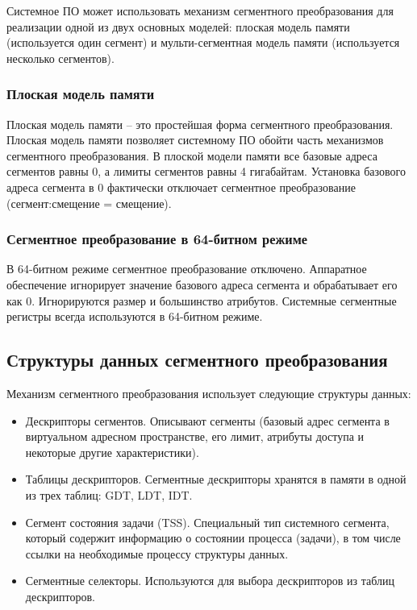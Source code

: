 Системное ПО может использовать механизм сегментного преобразования для реализации одной из двух основных
моделей: плоская модель памяти (используется один сегмент) и мульти-сегментная модель памяти
(используется несколько сегментов).

\subsubsection*{Плоская модель памяти}
Плоская модель памяти -- это простейшая форма сегментного преобразования. Плоская модель памяти позволяет
системному ПО обойти часть механизмов сегментного преобразования. В плоской модели памяти все базовые адреса
сегментов равны 0, а лимиты сегментов равны 4 гигабайтам. Установка базового адреса сегмента в 0 фактически
отключает сегментное преобразование (сегмент:смещение = смещение).

\subsubsection*{Сегментное преобразование в 64-битном режиме}
В 64-битном режиме сегментное преобразование отключено. Аппаратное обеспечение игнорирует значение
базового адреса сегмента и обрабатывает его как 0. Игнорируются размер и большинство атрибутов.
Системные сегментные регистры всегда используются в 64-битном режиме.

\subsection{Структуры данных сегментного преобразования}
Механизм сегментного преобразования использует следующие структуры данных:
\begin{itemize}
\item Дескрипторы сегментов. Описывают сегменты (базовый адрес сегмента в виртуальном
	адресном пространстве, его лимит, атрибуты доступа и некоторые другие характеристики).
\item Таблицы дескрипторов. Сегментные дескрипторы хранятся в памяти в одной из трех таблиц: GDT, LDT, IDT.
\item Сегмент состояния задачи (TSS). Специальный тип системного сегмента, который содержит
	информацию о состоянии процесса (задачи), в том числе ссылки на необходимые процессу структуры данных.
\item Сегментные селекторы. Используются для выбора дескрипторов из таблиц дескрипторов.
\end{itemize}

